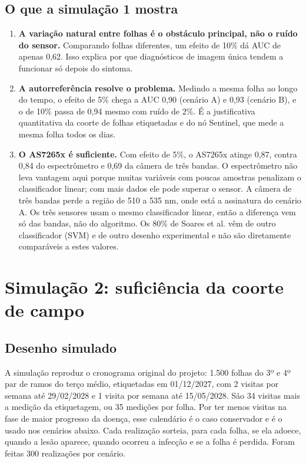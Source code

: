 \documentclass[11pt,a4paper]{article}
\begin{document}
\subsection{O que a simulação 1 mostra}
\begin{enumerate}
\item \textbf{A variação natural entre folhas é o obstáculo principal, não o ruído do sensor.} Comparando folhas diferentes, um efeito de 10\% dá AUC de apenas 0,62. Isso explica por que diagnósticos de imagem única tendem a funcionar só depois do sintoma.
\item \textbf{A autorreferência resolve o problema.} Medindo a mesma folha ao longo do tempo, o efeito de 5\% chega a AUC 0,90 (cenário A) e 0,93 (cenário B), e o de 10\% passa de 0,94 mesmo com ruído de 2\%. É a justificativa quantitativa da coorte de folhas etiquetadas e do nó Sentinel, que mede a mesma folha todos os dias.
\item \textbf{O AS7265x é suficiente.} Com efeito de 5\%, o AS7265x atinge 0,87, contra 0,84 do espectrômetro e 0,69 da câmera de três bandas. O espectrômetro não leva vantagem aqui porque muitas variáveis com poucas amostras penalizam o classificador linear; com mais dados ele pode superar o sensor. A câmera de três bandas perde a região de 510 a 535 nm, onde está a assinatura do cenário A. Os três sensores usam o mesmo classificador linear, então a diferença vem só das bandas, não do algoritmo. Os 80\% de Soares et al. vêm de outro classificador (SVM) e de outro desenho experimental e não são diretamente comparáveis a estes valores.
\end{enumerate}

\section{Simulação 2: suficiência da coorte de campo}
\subsection{Desenho simulado}
A simulação reproduz o cronograma original do projeto: 1.500 folhas do 3º e 4º par de ramos do terço médio, etiquetadas em 01/12/2027, com 2 visitas por semana até 29/02/2028 e 1 visita por semana até 15/05/2028. São 34 visitas mais a medição da etiquetagem, ou 35 medições por folha. Por ter menos visitas na fase de maior progresso da doença, esse calendário é o caso conservador e é o usado nos cenários abaixo. Cada realização sorteia, para cada folha, se ela adoece, quando a lesão aparece, quando ocorreu a infecção e se a folha é perdida. Foram feitas 300 realizações por cenário.
\end{document}
